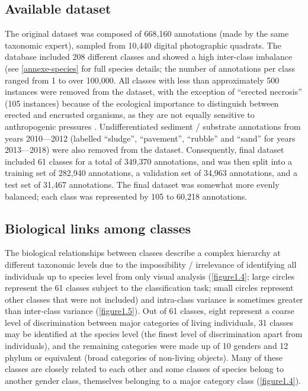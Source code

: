 \subsection{Available dataset}\label{chapitre1_3.2}
The original dataset was composed of 668,160 annotations (made by the same taxonomic expert), sampled from 10,440 digital photographic quadrats. The database included 208 different classes and showed a high inter-class imbalance (see \autoref{annexe-species} for full species details; the number of annotations per class ranged from 1 to over 100,000. All classes with less than approximately 500 instances were removed from the dataset, with the exception of “erected necrosis” (105 instances) because of the ecological importance to distinguish between erected and encrusted organisms, as they are not equally sensitive to anthropogenic pressures \citep{sartoretto_integrated_2017}. Undifferentiated sediment / substrate annotations from years 2010---2012 (labelled “sludge”, “pavement”, “rubble” and “sand” for years 2013---2018) were also removed from the dataset. Consequently, final dataset included 61 classes for a total of 349,370 annotations, and was then split into a training set of 282,940 annotations, a validation set of 34,963 annotations, and a test set of 31,467 annotations. The final dataset was somewhat more evenly balanced; each class was represented by 105 to 60,218 annotations.

\subsection{Biological links among classes }\label{chapitre1_3.3}
The biological relationships between classes describe a complex hierarchy at different taxonomic levels due to the impossibility / irrelevance of identifying all individuals up to species level from only visual analysis (\autoref{figure1.4}; large circles represent the 61 classes subject to the classification task; small circles represent other classes that were not included) and intra-class variance is sometimes greater than inter-class variance (\autoref{figure1.5}). Out of 61 classes, eight represent a coarse level of discrimination between major categories of living individuals, 31 classes may be identified at the species level (the finest level of discrimination apart from individuals), and the remaining categories were made up of 10 genders and 12 phylum or equivalent (broad categories of non-living objects). Many of these classes are closely related to each other and some classes of species belong to another gender class, themselves belonging to a major category class (\autoref{figure1.4}).

